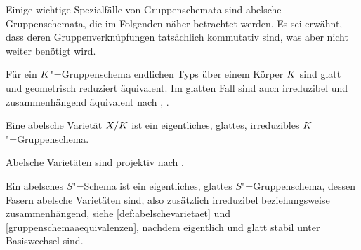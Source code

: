 Einige wichtige Spezialfälle von Gruppenschemata sind abelsche
Gruppenschemata, die im Folgenden näher betrachtet werden. Es sei
erwähnt, dass deren Gruppenverknüpfungen tatsächlich kommutativ sind,
was aber nicht weiter benötigt wird.
\begin{Bemerkung}\label{gruppenschemaaequivalenzen}
  Für ein $K$"=Gruppenschema endlichen Typs über einem Körper $K$
  sind glatt und geometrisch reduziert äquivalent.
  Im glatten Fall sind auch irreduzibel und zusammenhängend äquivalent
  nach \cite[Exercise~3.16]{wedhorn}, \cite[Corollary~16.51]{wedhorn}.
\end{Bemerkung}
\begin{Definition}\label{def:abelschevarietaet}
  Eine abelsche Varietät $X/K$ ist ein eigentliches, glattes,
  irreduzibles $K$"=Gruppenschema.
\end{Definition}
\begin{Bemerkung}\label{thm:abvarietaetprojektiv}
  Abelsche Varietäten sind projektiv nach
  \cite[Proposition~9.6/4]{bosch}.
\end{Bemerkung}

\begin{Definition}
  Ein abelsches $S$"=Schema ist ein eigentliches, glattes $S$"=Gruppenschema,
  dessen Fasern abelsche Varietäten sind,
  also zusätzlich irreduzibel beziehungsweise zusammenhängend,
  siehe \ref{def:abelschevarietaet} und \ref{gruppenschemaaequivalenzen},
  nachdem eigentlich und glatt stabil unter Basiswechsel sind.
\end{Definition}

